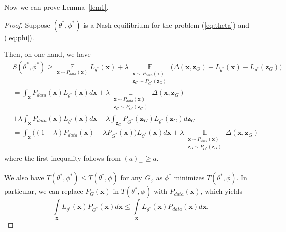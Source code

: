 Now we can prove Lemma~\ref{lem1}.
\begin{proof}
Suppose $(\theta^*,\phi^*)$ is a Nash equilibrium for the problem (\ref{eq:theta}) and (\ref{eq:phi}).

Then, on one hand, we have
\begin{equation}\label{eq:lower1}
\begin{aligned}
&S(\theta^*,\phi^*)\geq\mathop\mathbb E\limits_{\mathbf x\sim P_{data}(\mathbf x)} L_{\theta^*}(\mathbf x)
+ \lambda\mathop\mathbb E\limits_{\substack{\mathbf x\sim P_{data}(\mathbf x)\\ \mathbf z_G\sim P_{G^*}(\mathbf z_G)}} \big(\Delta(\mathbf x, \mathbf z_G)
+L_{\theta^*}(\mathbf x)-L_{\theta^*}(\mathbf z_G)\big)\\
&=\int_\mathbf x P_{data}(\mathbf x) L_{\theta^*}(\mathbf x) d\mathbf x + \lambda \mathop \mathbb E\limits_{\substack{\mathbf x\sim P_{data}(\mathbf x) \\ \mathbf z_G\sim P_{G^*}(\mathbf z_G)}} \Delta(\mathbf x, \mathbf z_G) \\
&+\lambda\int_\mathbf x P_{data}(\mathbf x) L_{\theta^*}(\mathbf x) d\mathbf x - \lambda\int_{\mathbf z_G} P_{G^*}(\mathbf z_G) L_{\theta^*}(\mathbf z_G) d \mathbf z_G\\
&=\int_\mathbf x \big((1+\lambda)P_{data}(\mathbf x)- \lambda P_{G^*}(\mathbf x)\big)L_{\theta^*}(\mathbf x) d\mathbf x +\lambda \mathop \mathbb E\limits_{\substack{\mathbf x\sim P_{data}(\mathbf x) \\ \mathbf z_G\sim P_{G^*}(\mathbf z_G)}}\Delta(\mathbf x, \mathbf z_G)
\end{aligned}
\end{equation}
where the first inequality follows from $(a)_+\geq a$.

We also have $T(\theta^*,\phi^*)\leq T(\theta^*,\phi)$ for any $G_\phi$ as $\phi^*$ minimizes $T(\theta^*,\phi)$. In particular, we can replace $P_G(\mathbf x)$ in $T(\theta^*,\phi)$ with $P_{data}(\mathbf x)$, which yields
$$
\mathop\int\limits_{\mathbf x}L_{\theta^*}(\mathbf x)P_{G^*}(\mathbf x)d\mathbf x \leq
\mathop\int\limits_{\mathbf x}L_{\theta^*}(\mathbf x)P_{data}(\mathbf x)d\mathbf x.
$$


\end{proof}
